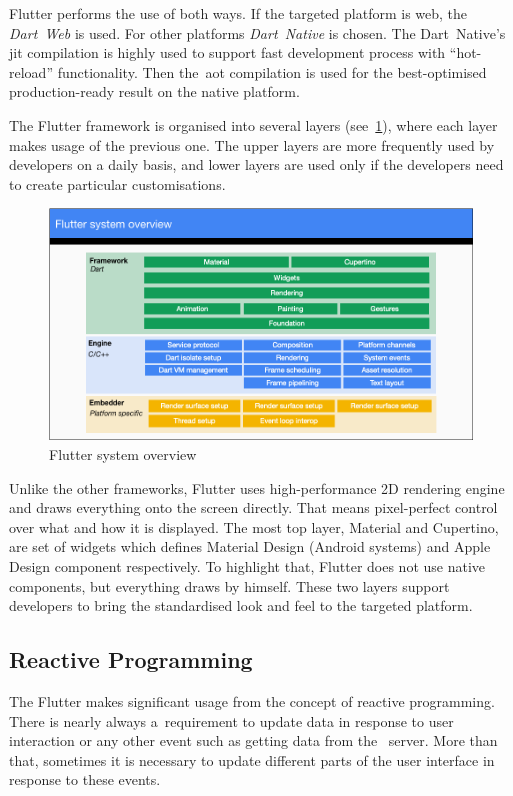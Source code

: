 Flutter performs the use of both ways. If the targeted platform is web, the \textit{Dart~Web} is used. For other platforms \textit{Dart~Native} is chosen. The Dart~Native's \gls{jit} compilation is highly used to support fast development process with ``hot-reload'' functionality. Then the~\gls{aot} compilation is used for the best-optimised production-ready result on the native platform.  

The Flutter framework is organised into several layers (see~\cref{fig:flutter-layer-cake}), where each layer makes usage of the previous one. The upper layers are more frequently used by developers on a daily basis, and lower layers are used only if the developers need to create particular customisations. 

\begin{figure}[htp]
    \centering
    \includegraphics[width=0.8\linewidth]{img/flutter/flutter-layer-cake.png}
    \caption{Flutter system overview~\cite{flutter-technical-overview}}
    \label{fig:flutter-layer-cake}
\end{figure}

Unlike the other frameworks, Flutter uses high-performance 2D rendering engine and draws everything onto the screen directly. That means pixel-perfect control over what and how it is displayed. The most top layer, Material and Cupertino, are set of widgets which defines Material Design (Android systems) and Apple Design component respectively. To highlight that, Flutter does not use native components, but everything draws by himself. These two layers support developers to bring the standardised look and feel to the targeted platform. 

\subsection{Reactive Programming}
The Flutter makes significant usage from the concept of reactive programming. There is nearly always a~requirement to update data in response to user interaction or any other event such as getting data from the~ server. More than that, sometimes it is necessary to update different parts of the user interface in response to these events. 

